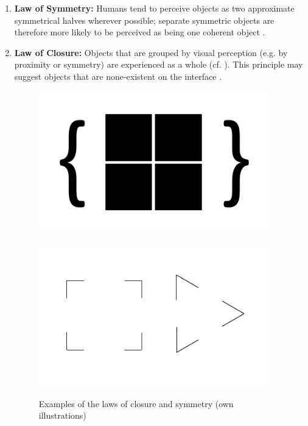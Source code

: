 \begin{enumerate}
    \item \textbf{Law of Symmetry:} Humans tend to perceive objects as two approximate symmetrical halves wherever possible; separate symmetric objects are therefore more likely to be perceived as being one coherent object \parencite[cf.][]{Soegaard.n.y.}.
    
    \item \textbf{Law of Closure:} Objects that are grouped by visual perception (e.g. by proximity or symmetry) are experienced as a whole (cf. ). This principle may suggest objects that are none-existent on the interface \parencite[cf.][]{Stevenson.n.y.}.
    
    \begin{figure}[H] 
        \begin{minipage}[b]{.49\linewidth}
            \centering\includegraphics[width=0.94\textwidth]{img/symmetry.pdf}
            \label{fig:sym}
        \end{minipage}
        \begin{minipage}[b]{.49\linewidth}
            \centering\includegraphics[width=0.94\textwidth]{img/closure.pdf}
            \label{fig:clo}
        \end{minipage}%
        \caption[Laws of Closure and Symmetry]{Examples of the laws of closure and symmetry (own illustrations)}\label{fig:law2}
    \end{figure}
    

\end{enumerate}
